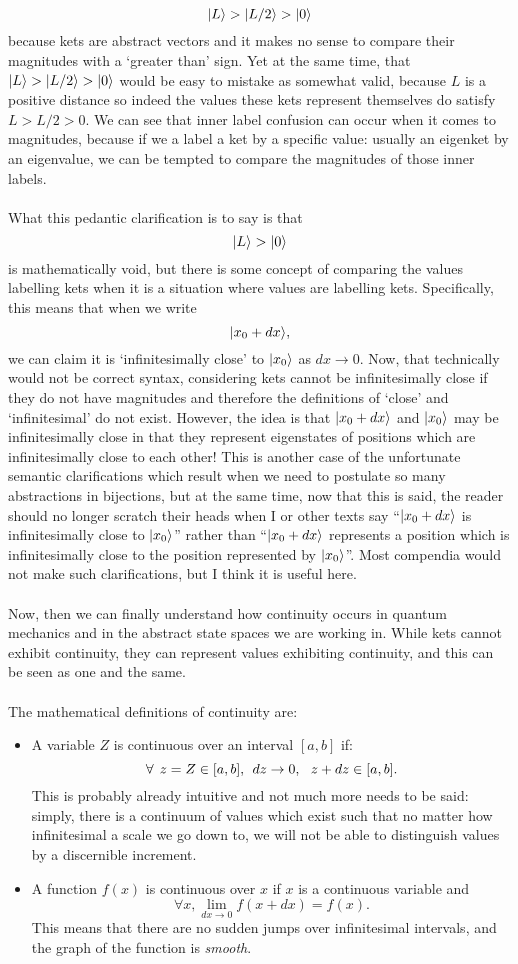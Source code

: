 $$
|L\rangle > |L/2\rangle > |0\rangle
$$
because kets are abstract vectors and it makes no sense to compare their magnitudes with a `greater than' sign. Yet at the same time, that $|L\rangle>|L/2\rangle>|0\rangle$ would be easy to mistake as somewhat valid, because $L$ is a positive distance so indeed the values these kets represent themselves do satisfy $L>L/2>0$. We can see that inner label confusion can occur when it comes to magnitudes, because if we a label a ket by a specific value: usually an eigenket by an eigenvalue, we can be tempted to compare the magnitudes of those inner labels.
\\\\
What this pedantic clarification is to say is that
$$
|L\rangle > |0\rangle
$$
is mathematically void, but there is some concept of comparing the values labelling kets when it is a situation where values are labelling kets. Specifically, this means that when we write 
$$
|x_{0}+dx\rangle,
$$
we can claim it is `infinitesimally close' to $|x_{0}\rangle$ as $dx\to0$. Now, that technically would not be correct syntax, considering kets cannot be infinitesimally close if they do not have magnitudes and therefore the definitions of `close' and `infinitesimal' do not exist. However, the idea is that $|x_{0}+dx\rangle$ and $|x_{0}\rangle$ may be infinitesimally close in that they represent eigenstates of positions which are infinitesimally close to each other! This is another case of the unfortunate semantic clarifications which result when we need to postulate so many abstractions in bijections, but at the same time, now that this is said, the reader should no longer scratch their heads when I or other texts say ``$|x_{0}+dx\rangle$ is infinitesimally close to $|x_{0}\rangle$'' rather than ``$|x_{0}+dx\rangle$ represents a position which is infinitesimally close to the position represented by $|x_{0}\rangle$''. Most compendia would not make such clarifications, but I think it is useful here.
\\\\
Now, then we can finally understand how continuity occurs in quantum mechanics and in the abstract state spaces we are working in. While kets cannot exhibit continuity, they can represent values exhibiting continuity, and this can be seen as one and the same.
\\\\
The mathematical definitions of continuity are:
\begin{itemize}
    \item A variable $Z$ is continuous over an interval $[a,b]$ if:
    $$
    \forall\:\: z=Z\in[a,b], \:\: dz\to 0, \:\:\: z+dz\in[a,b].
    $$
    This is probably already intuitive and not much more needs to be said: simply, there is a continuum of values which exist such that no matter how infinitesimal a scale we go down to, we will not be able to distinguish values by a discernible increment. 
    \item A function $f(x)$ is continuous over $x$ if $x$ is a continuous variable and
    $$
    \forall x, \lim_{dx\to 0}f(x+dx)=f(x).
    $$
    This means that there are no sudden jumps over infinitesimal intervals, and the graph of the function is \textit{smooth}.
\end{itemize}
